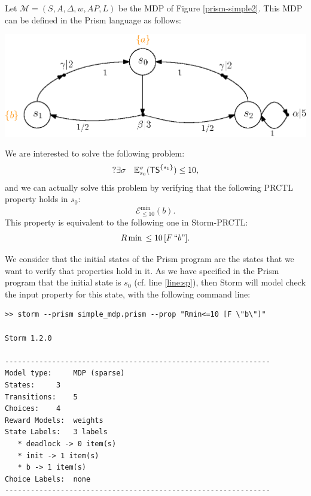 \begin{example}
Let $\mathcal{M}=(S, A, \Delta, w, AP, L)$ be the MDP of Figure \ref{prism-simple2}. This MDP can be defined in the Prism language as follows:\\
\begin{minipage}{0.4\linewidth}
  
\end{minipage}
\begin{minipage}{0.6\linewidth}
    \includegraphics[width=\linewidth]{resources/simple-mdp}
    \captionsetup{justification=centering}
    \label{prism-simple2}
\end{minipage}
We are interested to solve the following \SSPE{} problem:
\[
  ?\exists \sigma \quad \mathbb{E}_{s_0}^\sigma(\text{\sffamily TS}^{\{s_1\}}) \leq 10,
\]
and we can actually solve this problem by verifying that the following PRCTL property holds in $s_0$:
\[
  \mathcal{E}_{\leq 10}^{\min}(b).
\]
This property is equivalent to the following one in Storm-PRCTL:
\[
  R\min\,\leq 10\, [F \, ``b"].
\]

We consider that the initial states of the Prism program are the states that we want to verify that properties hold in it.
As we have specified in the Prism program that the initial state is $s_0$ (cf. line \ref{line:sp}), then Storm will model check the input property for this state, with the following command line:

{\footnotesize
\begin{verbatim}
>> storm --prism simple_mdp.prism --prop "Rmin<=10 [F \"b\"]"

Storm 1.2.0

--------------------------------------------------------------
Model type: 	MDP (sparse)
States: 	3
Transitions: 	5
Choices: 	4
Reward Models:  weights
State Labels: 	3 labels
   * deadlock -> 0 item(s)
   * init -> 1 item(s)
   * b -> 1 item(s)
Choice Labels: 	none
--------------------------------------------------------------


\end{verbatim}}
\end{example}
